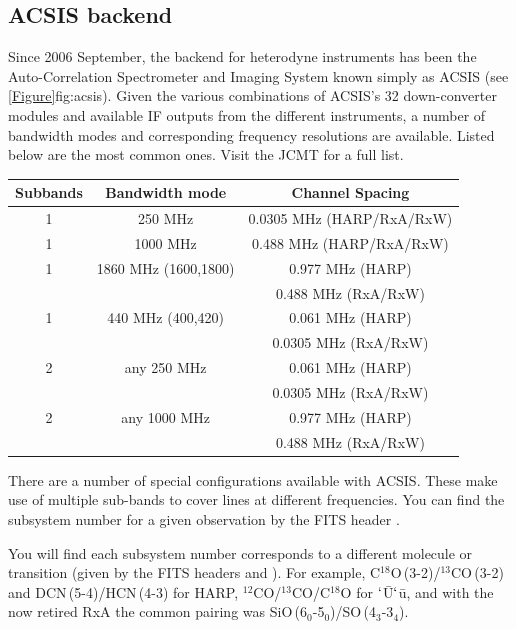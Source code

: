 \documentclass[11pt,oneside,chapters]{starlink}
\begin{document}
\subsection{ACSIS backend}

Since 2006 September, the backend for heterodyne instruments has been the
Auto-Correlation Spectrometer and Imaging System known simply as ACSIS
(see \cref{Figure}{fig:acsis}{}). Given the various combinations of
ACSIS's 32 down-converter modules and available IF outputs from the
different instruments, a number of bandwidth modes and corresponding
frequency resolutions are available. Listed below are the most common
ones. Visit the JCMT  for a full list.

\newpage
\begin{table}[h!]
\begin{center}
\begin{tabular}{c|c|c}
\hline
\textbf{Subbands} & \textbf{Bandwidth mode}  & \textbf{Channel Spacing}\\
\hline
1 & 250 MHz & 0.0305 MHz (HARP/RxA/RxW)\\
1 &1000 MHz & 0.488 MHz (HARP/RxA/RxW)\\
1 &1860 MHz (1600,1800) & 0.977 MHz (HARP) \\
  &         & 0.488 MHz (RxA/RxW)\\
1 & 440 MHz (400,420) & 0.061 MHz (HARP) \\
  &         & 0.0305 MHz (RxA/RxW)\\
\hline
2 & any 250 MHz      & 0.061 MHz (HARP)\\
  &         & 0.0305 MHz (RxA/RxW)\\
2 &any 1000 MHz & 0.977 MHz (HARP) \\
  &         & 0.488 MHz (RxA/RxW)\\
\hline
\end{tabular}
\label{fig:backend}
\end{center}
\end{table}
There are a number of special configurations available with ACSIS.
These make use of multiple sub-bands to cover lines at different
frequencies.  You can find the subsystem number for a given
observation by the FITS header .

You will find each subsystem number corresponds to a different
molecule or transition (given by the FITS headers  and
). For example,
C$^{18}$O\,(3-2)/$^{13}$CO\,(3-2) and DCN\,(5-4)/HCN\,(4-3) for HARP,
$^{12}$CO/$^{13}$CO/C$^{18}$O for $`$\=U$`$\=u, and with the now retired
RxA the common pairing was SiO\,(6$_0$-5$_0$)/SO\,(4$_3$-3$_4$).
\end{document}
